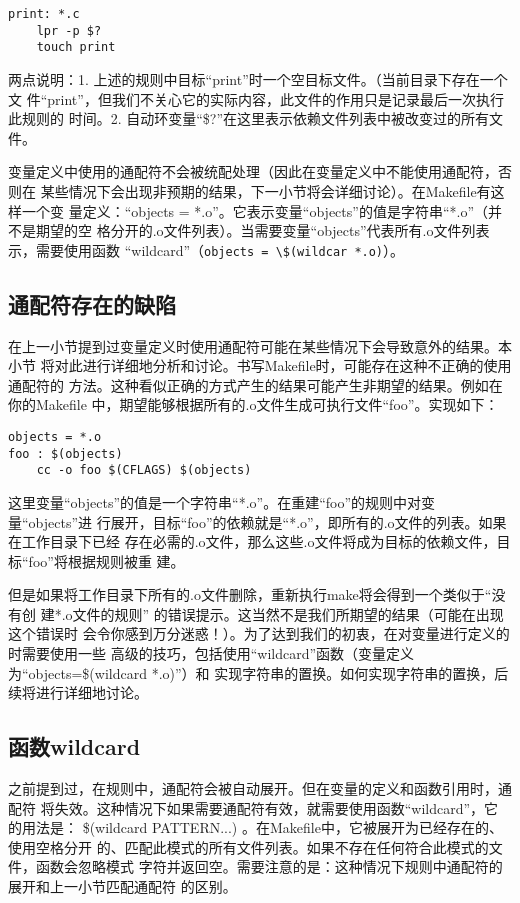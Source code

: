 \begin{Verbatim}[]
print: *.c
    lpr -p $?
    touch print
\end{Verbatim}

两点说明：1. 上述的规则中目标“print”时一个空目标文件。（当前目录下存在一个文
件“print”，但我们不关心它的实际内容，此文件的作用只是记录最后一次执行此规则的
时间。2. 自动环变量“\$?”在这里表示依赖文件列表中被改变过的所有文件。

变量定义中使用的通配符不会被统配处理（因此在变量定义中不能使用通配符，否则在
某些情况下会出现非预期的结果，下一小节将会详细讨论）。在Makefile有这样一个变
量定义：“objects = *.o”。它表示变量“objects”的值是字符串“*.o”（并不是期望的空
格分开的.o文件列表）。当需要变量“objects”代表所有.o文件列表示，需要使用函数
“wildcard”（\verb"objects = \$(wildcar *.o)"）。

\subsection{通配符存在的缺陷}
在上一小节提到过变量定义时使用通配符可能在某些情况下会导致意外的结果。本小节
将对此进行详细地分析和讨论。书写Makefile时，可能存在这种不正确的使用通配符的
方法。这种看似正确的方式产生的结果可能产生非期望的结果。例如在你的Makefile
中，期望能够根据所有的.o文件生成可执行文件“foo”。实现如下：
\begin{Verbatim}[]
objects = *.o
foo : $(objects)
    cc -o foo $(CFLAGS) $(objects)
\end{Verbatim}

这里变量“objects”的值是一个字符串“*.o”。在重建“foo”的规则中对变量“objects”进
行展开，目标“foo”的依赖就是“*.o”，即所有的.o文件的列表。如果在工作目录下已经
存在必需的.o文件，那么这些.o文件将成为目标的依赖文件，目标“foo”将根据规则被重
建。

但是如果将工作目录下所有的.o文件删除，重新执行make将会得到一个类似于“没有创
建*.o文件的规则” 的错误提示。这当然不是我们所期望的结果（可能在出现这个错误时
会令你感到万分迷惑！）。为了达到我们的初衷，在对变量进行定义的时需要使用一些
高级的技巧，包括使用“wildcard”函数（变量定义为“objects=\$(wildcard *.o)”）和
实现字符串的置换。如何实现字符串的置换，后续将进行详细地讨论。

\subsection{函数wildcard}
之前提到过，在规则中，通配符会被自动展开。但在变量的定义和函数引用时，通配符
将失效。这种情况下如果需要通配符有效，就需要使用函数“wildcard”，它的用法是：
\$(wildcard PATTERN...) 。在Makefile中，它被展开为已经存在的、使用空格分开
的、匹配此模式的所有文件列表。如果不存在任何符合此模式的文件，函数会忽略模式
字符并返回空。需要注意的是：这种情况下规则中通配符的展开和上一小节匹配通配符
的区别。

